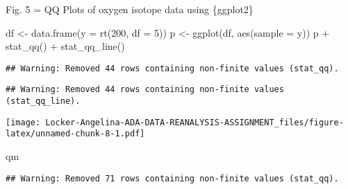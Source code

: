 \documentclass[]{article}
\newenvironment{Shaded}{\begin{snugshade}}{\end{snugshade}}
\newcommand{\KeywordTok}[1]{\textcolor[rgb]{0.13,0.29,0.53}{\textbf{#1}}}
\newcommand{\DataTypeTok}[1]{\textcolor[rgb]{0.13,0.29,0.53}{#1}}
\newcommand{\StringTok}[1]{\textcolor[rgb]{0.31,0.60,0.02}{#1}}
\newcommand{\OperatorTok}[1]{\textcolor[rgb]{0.81,0.36,0.00}{\textbf{#1}}}
\newcommand{\NormalTok}[1]{#1}
\begin{document}
Fig. 5 = QQ Plots of oxygen isotope data using \{ggplot2\}

df \textless{}- data.frame(y = rt(200, df = 5)) p \textless{}-
ggplot(df, aes(sample = y)) p + stat\_qq() + stat\_qq\_line()

\begin{Shaded}
\end{Shaded}

\begin{verbatim}
## Warning: Removed 44 rows containing non-finite values (stat_qq).
\end{verbatim}

\begin{verbatim}
## Warning: Removed 44 rows containing non-finite values (stat_qq_line).
\end{verbatim}

\texttt{[image: Locker-Angelina-ADA-DATA-REANALYSIS-ASSIGNMENT\_files/figure-latex/unnamed-chunk-8-1.pdf]}

\begin{Shaded}
\begin{Highlighting}[]
\NormalTok{qm}
\end{Highlighting}
\end{Shaded}

\begin{verbatim}
## Warning: Removed 71 rows containing non-finite values (stat_qq).
\end{verbatim}
\end{document}
